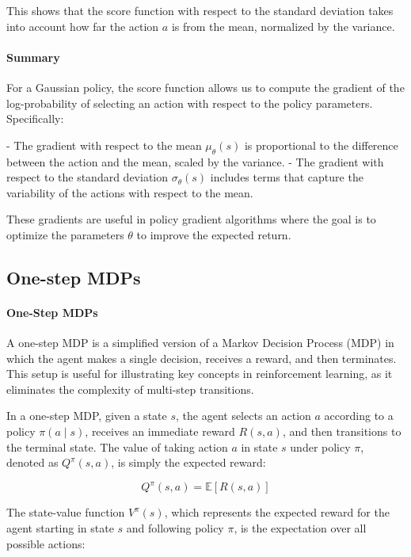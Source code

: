 \documentclass[10pt, oneside]{article}
\theoremstyle{definition}
\begin{document}
This shows that the score function with respect to the standard deviation takes into account how far the action $a$ is from the mean, normalized by the variance.

\paragraph{Summary}

For a Gaussian policy, the score function allows us to compute the gradient of the log-probability of selecting an action with respect to the policy parameters. Specifically:

- The gradient with respect to the mean $\mu_\theta(s)$ is proportional to the difference between the action and the mean, scaled by the variance.
- The gradient with respect to the standard deviation $\sigma_\theta(s)$ includes terms that capture the variability of the actions with respect to the mean.

These gradients are useful in policy gradient algorithms where the goal is to optimize the parameters $\theta$ to improve the expected return.

\subsection{One-step MDPs}

\paragraph{One-Step MDPs}

A one-step MDP is a simplified version of a Markov Decision Process (MDP) in which the agent makes a single decision, receives a reward, and then terminates. This setup is useful for illustrating key concepts in reinforcement learning, as it eliminates the complexity of multi-step transitions. 

In a one-step MDP, given a state $s$, the agent selects an action $a$ according to a policy $\pi(a \mid s)$, receives an immediate reward $R(s, a)$, and then transitions to the terminal state. The value of taking action $a$ in state $s$ under policy $\pi$, denoted as $Q^\pi(s, a)$, is simply the expected reward:

\[
Q^\pi(s, a) = \mathbb{E}[R(s, a)]
\]

The state-value function $V^\pi(s)$, which represents the expected reward for the agent starting in state $s$ and following policy $\pi$, is the expectation over all possible actions:
\end{document}
